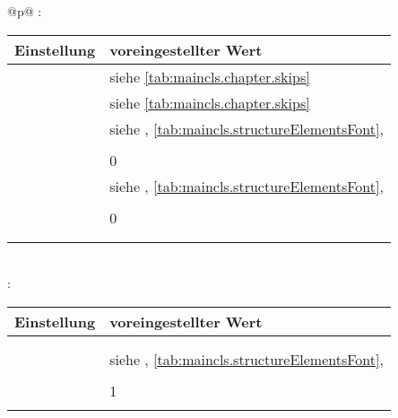 \begin{longtable}{@{}p{\columnwidth}@{}}
    : \\*
    \begin{tabularx}{\linewidth}{ll}
    \toprule
    Einstellung & voreingestellter Wert \\
    \midrule
    \PValue{afterskip}   & siehe \autoref{tab:maincls.chapter.skips} \\
    \PValue{beforeskip}  & siehe \autoref{tab:maincls.chapter.skips} \\
    \PValue{font}        & siehe  \DescRef{maincls.fontelement.chapter},
                           \autoref{tab:maincls.structureElementsFont}, 
                           \autopageref{tab:maincls.structureElementsFont} \\
    \PValue{innerskip}   & \PValue{0.5\Length{baselineskip}} \\
    \PValue{level}       & 0 \\
    \PValue{prefixfont}  & siehe 
                           \DescRef{maincls.fontelement.chapterprefix},
                           \autoref{tab:maincls.structureElementsFont}, 
                           \autopageref{tab:maincls.structureElementsFont} \\
    \PValue{tocindent}   & \PValue{0pt} \\
    \PValue{toclevel}    & 0 \\
    \PValue{tocnumwidth} & \PValue{1.5em} \\
    \PValue{tocstyle}    & \PValue{chapter} \\
    \bottomrule
    \end{tabularx} \\
    \addlinespace[\normalbaselineskip]
    : \\*
    \begin{tabularx}{\linewidth}{ll}
    \toprule
    Einstellung & voreingestellter Wert \\
    \midrule
    \PValue{afterskip}   & \PValue{2.3ex plus .2ex} \\
    \PValue{beforeskip}  & \PValue{-3.5ex plus -1ex minus -.2ex} \\
    \PValue{font}        & siehe  \DescRef{maincls.fontelement.section},
                           \autoref{tab:maincls.structureElementsFont}, 
                           \autopageref{tab:maincls.structureElementsFont} \\
    \PValue{indent}      & \PValue{0pt} \\
    \PValue{level}       & 1 \\
    \PValue{tocindent}   & \PValue{1.5em}\\

\end{tabularx}
\end{longtable}
